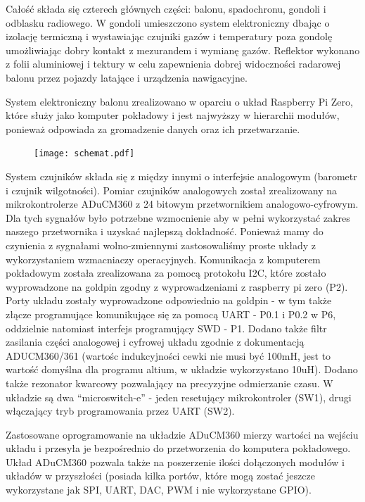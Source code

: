 \documentclass[a4paper,12pt]{article}
\begin{document}
Całość składa się czterech głównych części: balonu, spadochronu, gondoli i odblasku radiowego. W gondoli umieszczono system elektroniczny dbając o izolację termiczną i wystawiając czujniki gazów i temperatury poza gondolę umożliwiając dobry kontakt z mezurandem i wymianę gazów. Reflektor wykonano z folii aluminiowej i tektury w celu zapewnienia dobrej widoczności radarowej balonu przez pojazdy latające i urządzenia nawigacyjne.


System elektroniczny balonu zrealizowano w oparciu o układ Raspberry Pi Zero, które służy jako komputer pokładowy i jest najwyższy w hierarchii modułów, ponieważ odpowiada za gromadzenie danych oraz ich przetwarzanie.

\begin{figure}[H]
\texttt{[image: schemat.pdf]}
\centering{}
 \label{schem}
\end{figure}


System czujników składa się z między innymi o interfejsie analogowym (barometr i czujnik wilgotności). Pomiar czujników analogowych został zrealizowany na mikrokontrolerze ADuCM360 z 24 bitowym przetwornikiem analogowo-cyfrowym. Dla tych sygnałów było potrzebne wzmocnienie aby w pełni wykorzystać zakres naszego przetwornika i uzyskać najlepszą dokładność. Ponieważ mamy do czynienia z sygnałami wolno-zmiennymi zastosowaliśmy proste układy z wykorzystaniem wzmacniaczy operacyjnych. Komunikacja z komputerem pokładowym została zrealizowana za pomocą protokołu I2C, które zostało wyprowadzone na goldpin zgodny z wyprowadzeniami z raspberry pi zero (P2).  Porty układu zostały wyprowadzone odpowiednio na goldpin - w tym także złącze programujące komunikujące się za pomocą UART - P0.1 i P0.2 w P6, oddzielnie natomiast interfejs programujący SWD - P1. Dodano także filtr zasilania części analogowej i cyfrowej układu zgodnie z dokumentacją ADUCM360/361 (wartośc indukcyjności cewki nie musi być 100mH, jest to wartość domyślna dla programu altium, w układzie wykorzystano 10uH). Dodano także rezonator kwarcowy pozwalający na precyzyjne odmierzanie czasu. W układzie są dwa ``microswitch-e'' - jeden resetujący mikrokontroler (SW1), drugi włączający tryb programowania przez UART (SW2).

Zastosowane oprogramowanie na układzie ADuCM360 mierzy wartości na wejściu układu i przesyła je bezpośrednio do przetworzenia do komputera pokładowego. Układ ADuCM360 pozwala także na poszerzenie ilości dołączonych modułów i układów w przyszłości (posiada kilka portów, które mogą zostać jeszcze wykorzystane jak SPI, UART, DAC, PWM i nie wykorzystane GPIO).
\end{document}
